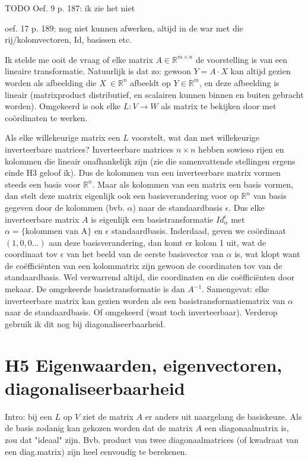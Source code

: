 \documentclass{article}
\begin{document}
TODO Oef. 9 p. 187: ik zie het niet

oef. 17 p. 189: nog niet kunnen afwerken, altijd in de war met die rij/kolomvectoren, Id, basissen etc. 

Ik stelde me ooit de vraag of elke matrix $A \in \mathbb{R}^{m \times n}$ de voorstelling is van een lineaire transformatie. Natuurlijk is dat zo: gewoon $Y = A \cdot X$ kan altijd gezien worden als afbeelding die $X \ \in \mathbb{R}^n$ afbeeldt op $Y \in \mathbb{R}^m$, en deze afbeelding is lineair (matrixproduct distributief, en scalairen kunnen binnen en buiten gebracht worden). 
Omgekeerd is ook elke $L : V \to W$ als matrix te bekijken door met co\"ordinaten te werken. 

Als elke willekeurige matrix een $L$ voorstelt, wat dan met willekeurige inverteerbare matrices? Inverteerbare matrices $n \times n$ hebben sowieso rijen en kolommen die lineair onafhankelijk zijn (zie die samenvattende stellingen ergens einde H3 geloof ik). Dus de kolommen van een inverteerbare matrix vormen steeds een basis voor $\mathbb{R}^n$. 
Maar als kolommen van een matrix een basis vormen, dan stelt deze matrix eigenlijk ook een basisverandering voor op $\mathbb{R}^n$ van basis gegeven door de kolommen (bvb. $\alpha$) naar de standaardbasis $\epsilon$. Dus elke inverteerbare matrix $A$ is eigenlijk een basistransformatie $Id_{\alpha}^{\epsilon}$ met $\alpha=\{ \text{kolommen van A} \}$ en $\epsilon$ standaardbasis. 
Inderdaad, geven we co\"ordinaat $(1,0,0...)$ aan deze basisverandering, dan komt er kolom 1 uit, wat de coordinaat tov $\epsilon$ van het beeld van de eerste basisvector van  $\alpha$ is, wat klopt want de co\"effici\"enten van een kolommatrix zijn gewoon de coordinaten tov van de standaardbasis. Wel verwarrend altijd, die coordinaten en die co\"effici\"enten door mekaar. 
De omgekeerde basistransformatie is dan $A^{-1}$. 
Samengevat: elke inverteerbare matrix kan gezien worden als een basistransformatiematrix van $\alpha$ naar de standaardbasis. Of omgekeerd (want toch inverteerbaar). Verderop gebruik ik dit nog bij diagonaliseerbaarheid. 



\section{H5 Eigenwaarden, eigenvectoren, diagonaliseerbaarheid}

Intro: bij een $L$ op $V$ ziet de matrix $A$ er anders uit naargelang de basiskeuze. Als de basis zodanig kan gekozen worden dat de matrix $A$ een diagonaalmatrix is, zou dat "ideaal" zijn. Bvb. product van twee diagonaalmatrices (of kwadraat van een diag.matrix) zijn heel eenvoudig te berekenen. 
\end{document}
